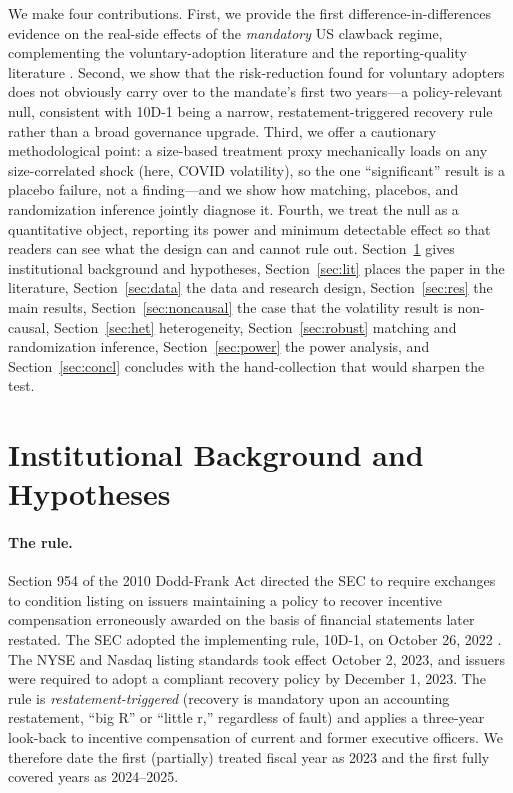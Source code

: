 \documentclass[12pt]{article}
\begin{document}
We make four contributions. First, we provide the first difference-in-differences evidence on
the real-side effects of the \emph{mandatory} US clawback regime, complementing the
voluntary-adoption literature \citep{liu2020,babenko2023,chen2015} and the reporting-quality
literature \citep{dehaan2013,chan2012,iskandar2013}. Second, we show that the risk-reduction
found for voluntary adopters does not obviously carry over to the mandate's first two years---a
policy-relevant null, consistent with 10D-1 being a narrow, restatement-triggered recovery rule
rather than a broad governance upgrade. Third, we offer a cautionary methodological point: a
size-based treatment proxy mechanically loads on any size-correlated shock (here, COVID
volatility), so the one ``significant'' result is a placebo failure, not a finding---and we show
how matching, placebos, and randomization inference jointly diagnose it. Fourth, we treat the
null as a quantitative object, reporting its power and minimum detectable effect so that readers
can see what the design can and cannot rule out. Section~\ref{sec:bg} gives institutional
background and hypotheses, Section~\ref{sec:lit} places the paper in the literature,
Section~\ref{sec:data} the data and research design, Section~\ref{sec:res} the main results,
Section~\ref{sec:noncausal} the case that the volatility result is non-causal,
Section~\ref{sec:het} heterogeneity, Section~\ref{sec:robust} matching and randomization
inference, Section~\ref{sec:power} the power analysis, and Section~\ref{sec:concl} concludes
with the hand-collection that would sharpen the test.

\section{Institutional Background and Hypotheses}\label{sec:bg}
\paragraph{The rule.} Section 954 of the 2010 Dodd-Frank Act directed the SEC to require
exchanges to condition listing on issuers maintaining a policy to recover incentive
compensation erroneously awarded on the basis of financial statements later restated. The SEC
adopted the implementing rule, 10D-1, on October 26, 2022 \citep{sec2022}. The NYSE and Nasdaq
listing standards took effect October 2, 2023, and issuers were required to adopt a compliant
recovery policy by December 1, 2023. The rule is \emph{restatement-triggered} (recovery is
mandatory upon an accounting restatement, ``big R'' or ``little r,'' regardless of fault) and
applies a three-year look-back to incentive compensation of current and former executive
officers. We therefore date the first (partially) treated fiscal year as 2023 and the first
fully covered years as 2024--2025.
\end{document}
